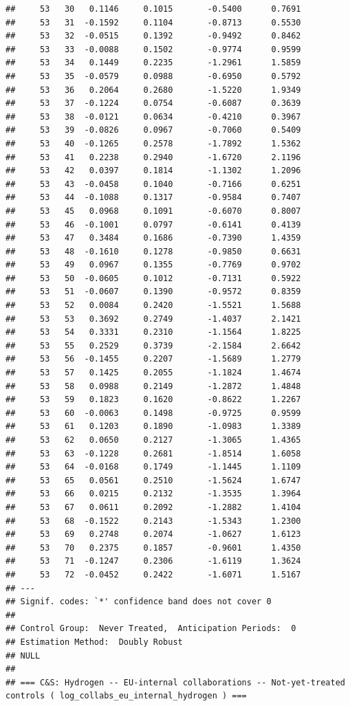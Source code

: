 \documentclass[
]{article}
\begin{document}
\begin{verbatim}
##     53   30   0.1146     0.1015       -0.5400      0.7691 
##     53   31  -0.1592     0.1104       -0.8713      0.5530 
##     53   32  -0.0515     0.1392       -0.9492      0.8462 
##     53   33  -0.0088     0.1502       -0.9774      0.9599 
##     53   34   0.1449     0.2235       -1.2961      1.5859 
##     53   35  -0.0579     0.0988       -0.6950      0.5792 
##     53   36   0.2064     0.2680       -1.5220      1.9349 
##     53   37  -0.1224     0.0754       -0.6087      0.3639 
##     53   38  -0.0121     0.0634       -0.4210      0.3967 
##     53   39  -0.0826     0.0967       -0.7060      0.5409 
##     53   40  -0.1265     0.2578       -1.7892      1.5362 
##     53   41   0.2238     0.2940       -1.6720      2.1196 
##     53   42   0.0397     0.1814       -1.1302      1.2096 
##     53   43  -0.0458     0.1040       -0.7166      0.6251 
##     53   44  -0.1088     0.1317       -0.9584      0.7407 
##     53   45   0.0968     0.1091       -0.6070      0.8007 
##     53   46  -0.1001     0.0797       -0.6141      0.4139 
##     53   47   0.3484     0.1686       -0.7390      1.4359 
##     53   48  -0.1610     0.1278       -0.9850      0.6631 
##     53   49   0.0967     0.1355       -0.7769      0.9702 
##     53   50  -0.0605     0.1012       -0.7131      0.5922 
##     53   51  -0.0607     0.1390       -0.9572      0.8359 
##     53   52   0.0084     0.2420       -1.5521      1.5688 
##     53   53   0.3692     0.2749       -1.4037      2.1421 
##     53   54   0.3331     0.2310       -1.1564      1.8225 
##     53   55   0.2529     0.3739       -2.1584      2.6642 
##     53   56  -0.1455     0.2207       -1.5689      1.2779 
##     53   57   0.1425     0.2055       -1.1824      1.4674 
##     53   58   0.0988     0.2149       -1.2872      1.4848 
##     53   59   0.1823     0.1620       -0.8622      1.2267 
##     53   60  -0.0063     0.1498       -0.9725      0.9599 
##     53   61   0.1203     0.1890       -1.0983      1.3389 
##     53   62   0.0650     0.2127       -1.3065      1.4365 
##     53   63  -0.1228     0.2681       -1.8514      1.6058 
##     53   64  -0.0168     0.1749       -1.1445      1.1109 
##     53   65   0.0561     0.2510       -1.5624      1.6747 
##     53   66   0.0215     0.2132       -1.3535      1.3964 
##     53   67   0.0611     0.2092       -1.2882      1.4104 
##     53   68  -0.1522     0.2143       -1.5343      1.2300 
##     53   69   0.2748     0.2074       -1.0627      1.6123 
##     53   70   0.2375     0.1857       -0.9601      1.4350 
##     53   71  -0.1247     0.2306       -1.6119      1.3624 
##     53   72  -0.0452     0.2422       -1.6071      1.5167 
## ---
## Signif. codes: `*' confidence band does not cover 0
## 
## Control Group:  Never Treated,  Anticipation Periods:  0
## Estimation Method:  Doubly Robust
## NULL
## 
## === C&S: Hydrogen -- EU-internal collaborations -- Not-yet-treated controls ( log_collabs_eu_internal_hydrogen ) ===
\end{verbatim}
\end{document}
